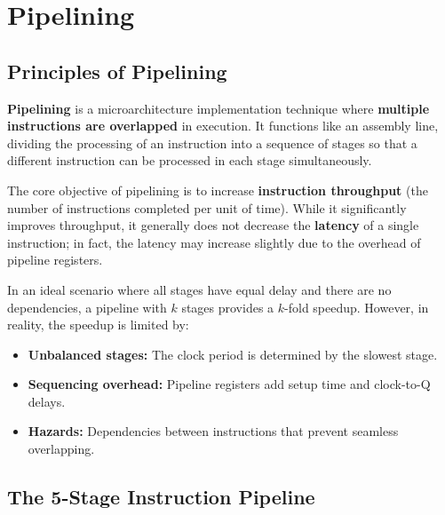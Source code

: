 \section{Pipelining}

\subsection{Principles of Pipelining}

\begin{definition}
\textbf{Pipelining} is a microarchitecture implementation technique where \textbf{multiple instructions are overlapped} in execution. It functions like an assembly line, dividing the processing of an instruction into a sequence of stages so that a different instruction can be processed in each stage simultaneously.
\end{definition}

\begin{important}
The core objective of pipelining is to increase \textbf{instruction throughput} (the number of instructions completed per unit of time). While it significantly improves throughput, it generally does not decrease the \textbf{latency} of a single instruction; in fact, the latency may increase slightly due to the overhead of pipeline registers.
\end{important}

\begin{theorem}
In an ideal scenario where all stages have equal delay and there are no dependencies, a pipeline with $k$ stages provides a $k$-fold speedup. However, in reality, the speedup is limited by:
\begin{itemize}
    \item \textbf{Unbalanced stages:} The clock period is determined by the slowest stage.
    \item \textbf{Sequencing overhead:} Pipeline registers add setup time and clock-to-Q delays.
    \item \textbf{Hazards:} Dependencies between instructions that prevent seamless overlapping.
\end{itemize}
\end{theorem}



\subsection{The 5-Stage Instruction Pipeline}

